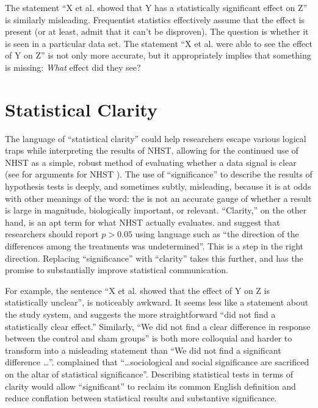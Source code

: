 The statement ``X et al. showed that Y has a statistically significant effect on Z'' is similarly misleading.
Frequentist statistics effectively assume that the effect is present (or at least, admit that it can't be disproven).
The question is whether it is seen in a particular data set.
The statement ``X et al. were able to see the effect of Y on Z'' is not only more accurate, but it appropriately implies that something is missing: \emph{What} effect did they see?

\section*{Statistical Clarity}

The language of ``statistical clarity'' could help researchers escape various logical traps while interpreting the results of NHST, allowing for the continued use of NHST as a simple, robust method of evaluating whether a data signal is clear (see \citealt{Abelson1997} for arguments for NHST ).
The use of ``significance'' to describe the results of hypothesis tests is deeply, and sometimes subtly, misleading, because it is at odds with other meanings of the word: the \pval is not an accurate gauge of whether a result is large in magnitude, biologically important, or relevant. ``Clarity,'' on the other hand, is an apt term for what NHST actually evaluates. 
\citet{jones2000sensible} and \citet{robinson2001past} suggest that researchers should report $p > 0.05$ using language such as ``the direction of the differences among the treatments was undetermined''. This is a step in the right direction. 
Replacing ``significance'' with ``clarity'' takes this further, and has the promise to substantially improve statistical communication.

For example, the sentence ``X et al. showed that the effect of Y on Z is statistically unclear'', is noticeably awkward. It seems less like a statement about the study system, and suggests the more straightforward ``did not find a statistically clear effect.''
Similarly, ``We did not find a clear difference in response between the control and sham groups'' is both more colloquial and harder to transform into a misleading statement than ``We did not find a significant difference \ldots''.
\citet{Bernardietal.2017} complained that ``\ldots sociological and social significance are sacrificed on the altar of statistical significance''.
Describing statistical tests in terms of clarity would allow ``significant'' to reclaim its common English definition and reduce conflation between statistical results and substantive significance.

